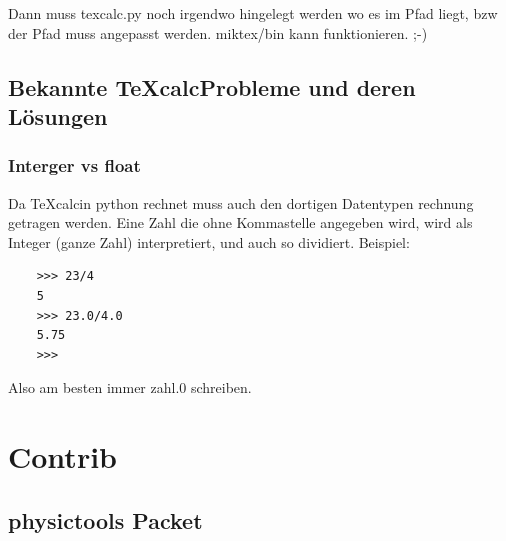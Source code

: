 \documentclass[a4paper]{article}
\newcommand{\texcalc}{{\TeX}calc}
\begin{document}
%
%

Dann muss texcalc.py noch irgendwo hingelegt werden wo es im Pfad liegt, bzw
der Pfad muss angepasst werden. miktex/bin kann funktionieren. ;-)\\


\subsection{Bekannte \texcalc Probleme und deren Lösungen}

\subsubsection{Interger vs float}
\label{integer}

Da \texcalc in python rechnet muss auch den dortigen Datentypen rechnung getragen werden.
Eine Zahl die ohne Kommastelle angegeben wird, wird als Integer (ganze Zahl) interpretiert,
und auch so dividiert. Beispiel:\\

\begin{verbatim}
	>>> 23/4
	5
	>>> 23.0/4.0
	5.75
	>>>
\end{verbatim}

Also am besten immer zahl.0 schreiben.

\section{Contrib}

\subsection{physictools Packet}
\end{document}
